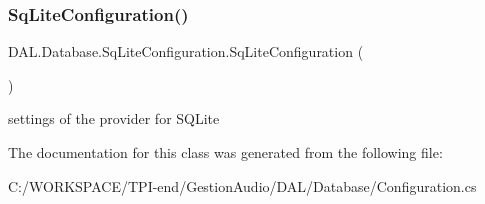 \subsubsection{\texorpdfstring{Sq\+Lite\+Configuration()}{SqLiteConfiguration()}}
{\footnotesize\ttfamily D\+A\+L.\+Database.\+Sq\+Lite\+Configuration.\+Sq\+Lite\+Configuration (\begin{DoxyParamCaption}{ }\end{DoxyParamCaption})}



settings of the provider for S\+Q\+Lite 



The documentation for this class was generated from the following file\+:\begin{DoxyCompactItemize}
\item 
C\+:/\+W\+O\+R\+K\+S\+P\+A\+C\+E/\+T\+P\+I-\/end/\+Gestion\+Audio/\+D\+A\+L/\+Database/Configuration.\+cs\end{DoxyCompactItemize}
